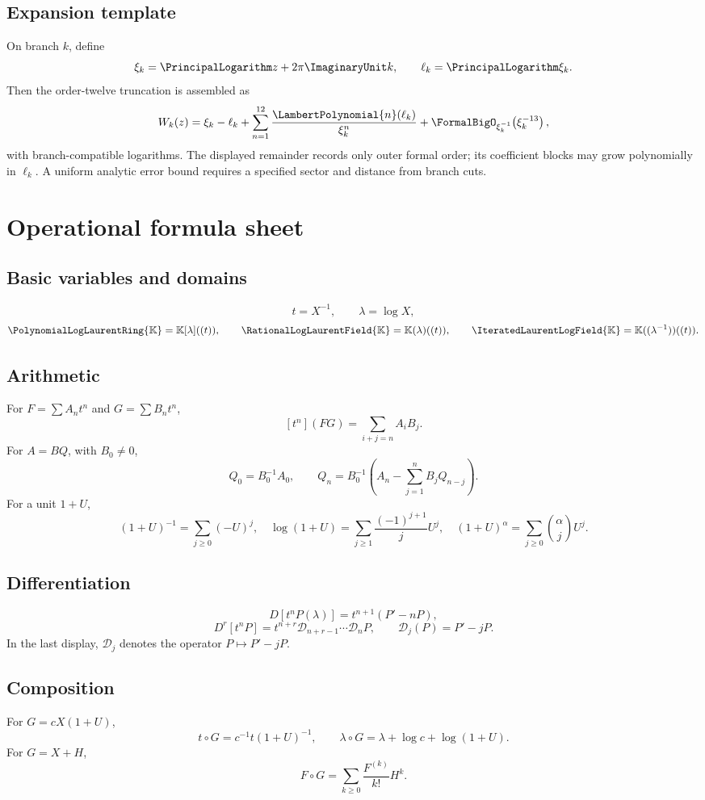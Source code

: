 \documentclass[11pt,openany]{book}
\theoremstyle{definition}
\theoremstyle{plain}
\theoremstyle{remark}
\newcommand{\K}{\mathbb{K}}
\newcommand{\Plog}{\PolynomialLogLaurentRing{\K}}
\newcommand{\Rlog}{\RationalLogLaurentField{\K}}
\newcommand{\Hlog}{\IteratedLaurentLogField{\K}}
\begin{document}
\section{Expansion template}
On branch \(k\), define
\[
 \xi_k=\PrincipalLogarithm z+2\pi\ImaginaryUnit k,
 \qquad
 \ell_k=\PrincipalLogarithm\xi_k.
\]
Then the order-twelve truncation is assembled as
\begin{equation}\label{eq:order12-template}
 W_k(z)=\xi_k-\ell_k+
 \sum_{n=1}^{12}\frac{\LambertPolynomial{n}(\ell_k)}{\xi_k^n}
 +\FormalBigO_{\xi_k^{-1}}\!\left(\xi_k^{-13}\right),
\end{equation}
with branch-compatible logarithms.  The displayed remainder records only outer
formal order; its coefficient blocks may grow polynomially in \(\ell_k\).  A
uniform analytic error bound requires a specified sector and distance from
branch cuts.

\chapter{Operational formula sheet}\label{app:formula-sheet}

\section{Basic variables and domains}
\[
 t=X^{-1},\qquad \lambda=\log X,
\]
\[
 \Plog=\K[\lambda]((t)),\qquad
 \Rlog=\K(\lambda)((t)),\qquad
 \Hlog=\K((\lambda^{-1}))((t)).
\]

\section{Arithmetic}
For \(F=\sum A_nt^n\) and \(G=\sum B_nt^n\),
\[
 [t^n](FG)=\sum_{i+j=n}A_iB_j.
\]
For \(A=BQ\), with \(B_0\ne0\),
\[
 Q_0=B_0^{-1}A_0,
 \qquad
 Q_n=B_0^{-1}\left(A_n-\sum_{j=1}^{n}B_jQ_{n-j}\right).
\]
For a unit \(1+U\),
\[
 (1+U)^{-1}=\sum_{j\ge0}(-U)^j,
 \quad
 \log(1+U)=\sum_{j\ge1}\frac{(-1)^{j+1}}jU^j,
 \quad
 (1+U)^\alpha=\sum_{j\ge0}\binom\alpha jU^j.
\]

\section{Differentiation}
\[
 D[t^nP(\lambda)]=t^{n+1}(P'-nP),
\]
\[
 D^r[t^nP]
 =t^{n+r}\mathcal D_{n+r-1}\cdots\mathcal D_nP,
 \qquad \mathcal D_j(P)=P'-jP.
\]
In the last display, \(\mathcal D_j\) denotes the operator \(P\mapsto P'-jP\).

\section{Composition}
For \(G=cX(1+U)\),
\[
 t\circ G=c^{-1}t(1+U)^{-1},
 \qquad
 \lambda\circ G=\lambda+\log c+\log(1+U).
\]
For \(G=X+H\),
\[
 F\circ G=\sum_{k\ge0}\frac{F^{(k)}}{k!}H^k.
\]
\end{document}
